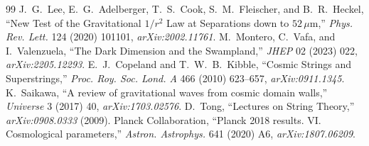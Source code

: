 \documentclass[11pt,a4paper]{article}
\theoremstyle{remark}
\begin{document}
\begin{thebibliography}{99}
 J.~G.~Lee, E.~G.~Adelberger, T.~S.~Cook, S.~M.~Fleischer, and B.~R.~Heckel, ``New Test of the Gravitational $1/r^2$ Law at Separations down to $52\,\mu$m,'' \textit{Phys. Rev. Lett.} 124 (2020) 101101, \textit{arXiv:2002.11761}.
 M.~Montero, C.~Vafa, and I.~Valenzuela, ``The Dark Dimension and the Swampland,'' \textit{JHEP} 02 (2023) 022, \textit{arXiv:2205.12293}.
 E.~J.~Copeland and T.~W.~B.~Kibble, ``Cosmic Strings and Superstrings,'' \textit{Proc. Roy. Soc. Lond. A} 466 (2010) 623--657, \textit{arXiv:0911.1345}.
 K.~Saikawa, ``A review of gravitational waves from cosmic domain walls,'' \textit{Universe} 3 (2017) 40, \textit{arXiv:1703.02576}.
 D.~Tong, ``Lectures on String Theory,'' \textit{arXiv:0908.0333} (2009).
 Planck Collaboration, ``Planck 2018 results. VI. Cosmological parameters,'' \textit{Astron. Astrophys.} 641 (2020) A6, \textit{arXiv:1807.06209}.

\end{thebibliography}
\end{document}

